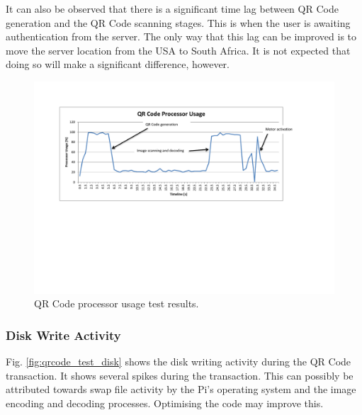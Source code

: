 It can also be observed that there is a significant time lag between QR Code generation
and the QR Code scanning stages. This is when the user is awaiting authentication from the
server. The only way that this lag can be improved is to move the server location from the
USA to South Africa. It is not expected that doing so will make a significant
difference, however.

\begin{figure}
 \centering 
 \includegraphics[clip=true, trim = 70 260 0 70,
 scale=0.7]{qrcode_test_cpu}
 \caption{QR Code processor usage test results.}
 \label{fig:qrcode_test_cpu}
\end{figure}

\subsubsection{Disk Write Activity}

Fig. \ref{fig:qrcode_test_disk} shows the disk writing activity during the QR Code
transaction. It shows several spikes during the transaction. This can possibly be
attributed towards swap file activity by the Pi's operating system and the image encoding
and decoding processes. Optimising the code may improve this.

